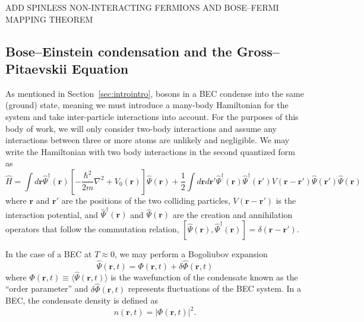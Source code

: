 ADD SPINLESS NON-INTERACTING FERMIONS AND BOSE--FERMI MAPPING THEOREM

\subsection{Bose--Einstein condensation and the Gross--Pitaevskii Equation}

As mentioned in Section~\ref{sec:introintro}, bosons in a BEC condense into the same (ground) state, meaning we must introduce a many-body Hamiltonian for the system and take inter-particle interactions into account.
For the purposes of this body of work, we will only consider two-body interactions and assume any interactions between three or more atoms are unlikely and negligible.
We may write the Hamiltonian with two body interactions in the second quantized form as
\begin{equation}
    \hat H = \int d\mathbf{r} \hat \Psi^\dagger(\mathbf{r})\left[-\frac{\hbar^2}{2m}\nabla^2 + V_0(\mathbf{r}) \right]\hat \Psi(\mathbf{r}) + \frac{1}{2} \int d\mathbf{r} d\mathbf{r'} \hat \Psi^\dagger(\mathbf{r}) \hat \Psi^\dagger(\mathbf{r'}) V(\mathbf{r} - \mathbf{r'})\hat \Psi(\mathbf{r'}) \hat \Psi(\mathbf{r})
    \label{eqn:2nd}
\end{equation}
where $\mathbf{r}$ and $\mathbf{r'}$ are the positions of the two colliding particles, $V(\mathbf{r}-\mathbf{r'})$ is the interaction potential, and $\hat \Psi^\dagger(\mathbf{r})$ and $\hat \Psi(\mathbf{r})$ are the creation and annihilation operators that follow the commutation relation, $[\hat \Psi(\mathbf{r}),\hat \Psi^\dagger(\mathbf{r})] = \delta(\mathbf{r} - \mathbf{r'})$.

In the case of a BEC at $T\approx0$, we may perform a Bogoliubov expansion~\cite{Bogoliubov1947, Dalfovo1999}
\begin{equation}
    \hat \Psi (\mathbf{r}, t) = \Phi(\mathbf{r},t) + \delta \hat \Phi(\mathbf{r},t)
\label{eqn:bog}
\end{equation}
where $\Phi(\mathbf{r},t) \equiv \langle \hat \Psi(\mathbf{r},t) \rangle$ is the wavefunction of the condensate known as the ``order parameter'' and $\delta \hat \Phi(\mathbf{r},t)$ represents fluctuations of the BEC system.
In a BEC, the condensate density is defined as
\begin{equation}
    n(\mathbf{r},t) = |\Phi(\mathbf{r},t)|^2.
\end{equation}

